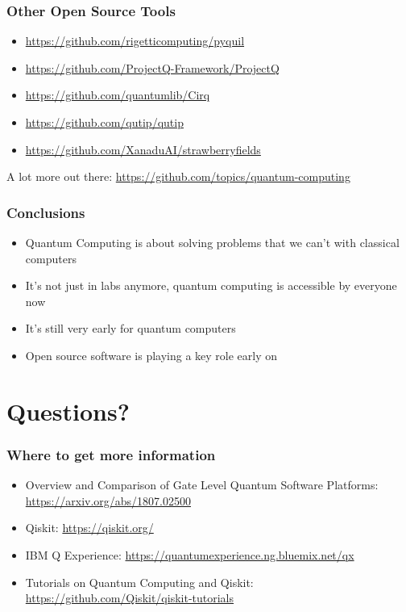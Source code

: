 \documentclass[aspectratio=169,11pt,hyperref={colorlinks=true}]{beamer}
\begin{document}
\begin{frame}
    \frametitle{Other Open Source Tools}
    \begin{itemize}
        \item \href{https://github.com/rigetticomputing/pyquil}{https://github.com/rigetticomputing/pyquil}
        \item \href{https://github.com/ProjectQ-Framework/ProjectQ}{https://github.com/ProjectQ-Framework/ProjectQ}
        \item \href{https://github.com/quantumlib/Cirq}{https://github.com/quantumlib/Cirq}
        \item \href{https://github.com/qutip/qutip}{https://github.com/qutip/qutip}
        \item \href{https://github.com/XanaduAI/strawberryfields}{https://github.com/XanaduAI/strawberryfields}
    \end{itemize}
    A lot more out there:
    \href{https://github.com/topics/quantum-computing}{https://github.com/topics/quantum-computing}
\end{frame}

\begin{frame}
    \frametitle{Conclusions}
    \begin{itemize}
        \item Quantum Computing is about solving problems that we can't with
            classical computers
        \item It's not just in labs anymore, quantum computing is accessible by
            everyone now
        \item It's still very early for quantum computers
        \item Open source software is playing a key role early on
    \end{itemize}
\end{frame}

\section{Questions?}
\begin{frame}
\frametitle{Where to get more information}
    \begin{itemize}
        \item Overview and Comparison of Gate Level Quantum Software Platforms: \href{https://arxiv.org/abs/1807.02500}{https://arxiv.org/abs/1807.02500}
        \item Qiskit: \href{https://qiskit.org/}{https://qiskit.org/}
        \item IBM Q Experience: \href{https://quantumexperience.ng.bluemix.net/qx}{https://quantumexperience.ng.bluemix.net/qx}
        \item Tutorials on Quantum Computing and Qiskit: \href{https://github.com/Qiskit/qiskit-tutorials}{https://github.com/Qiskit/qiskit-tutorials}
    \end{itemize}
\end{frame}
\end{document}
